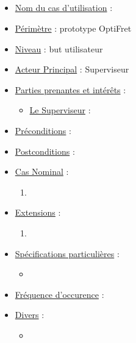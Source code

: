 \documentclass[a4paper]{report}
\begin{document}
\subsection{}
\begin{itemize}[label = \textbullet, font = \color{orange}]
\item \underline{Nom du cas d'utilisation} : 
\item \underline{Périmètre} : prototype OptiFret
\item \underline{Niveau} : but utilisateur
\item \underline{Acteur Principal} : Superviseur
\item \underline{Parties prenantes et intérêts} :
	\begin{itemize}[label = \textbullet, font = \color{blue}]
    \item \underline{Le Superviseur} : 
    \end{itemize}
\item \underline{Préconditions} :
\item \underline{Postconditions} :
\item \underline{Cas Nominal} :
	\begin{enumerate}
    	\item
    \end{enumerate}
\item \underline{Extensions} :
	\begin{enumerate}
    	\item
    \end{enumerate}
\item \underline{Spécifications particulières} :
	\begin{itemize}[label = \textbullet, font = \color{blue}]
    \item
    \end{itemize}
\item \underline{Fréquence d'occurence} : 
\item \underline{Divers} : 
\begin{itemize}[label = \textbullet, font = \color{blue}]
    \item
    \end{itemize}
\end{itemize}
\end{document}
